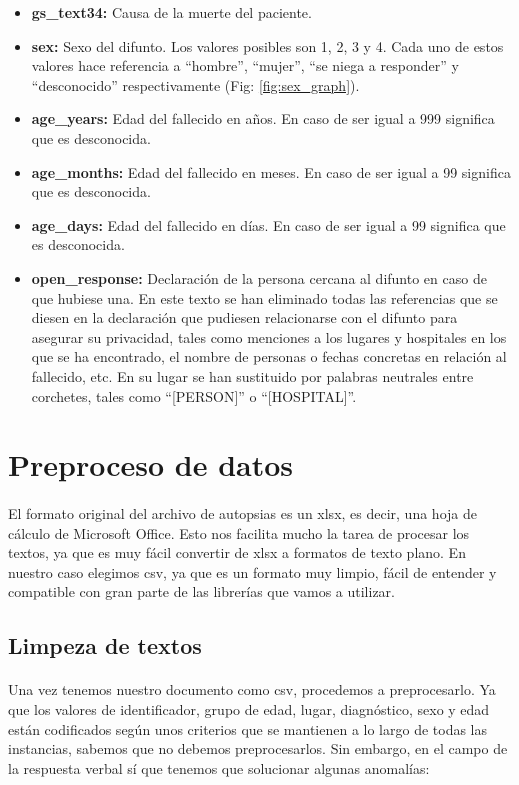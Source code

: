 \documentclass[10pt,a4paper]{article}
\begin{document}
\begin{itemize}
		\item \textbf{gs\_text34:} Causa de la muerte del paciente.
		\item \textbf{sex:} Sexo del difunto. Los valores posibles son 1, 2, 3 y 4. Cada uno de estos valores hace referencia a ``hombre'', ``mujer'', ``se niega a responder'' y ``desconocido'' respectivamente (Fig: \ref{fig:sex_graph}).
		\item \textbf{age\_years:} Edad del fallecido en años. En caso de ser igual a 999 significa que es desconocida.
		\item \textbf{age\_months:} Edad del fallecido en meses. En caso de ser igual a 99 significa que es desconocida.
		\item \textbf{age\_days:} Edad del fallecido en días. En caso de ser igual a 99 significa que es desconocida.
		\item \textbf{open\_response:} Declaración de la persona cercana al difunto en caso de que hubiese una. En este texto se han eliminado todas las referencias que se diesen en la declaración que pudiesen relacionarse con el difunto para asegurar su privacidad, tales como menciones a los lugares y hospitales en los que se ha encontrado, el nombre de personas o fechas concretas en relación al fallecido, etc. En su lugar se han sustituido por palabras neutrales entre corchetes, tales como ``[PERSON]'' o ``[HOSPITAL]''.
	\end{itemize}

\section{Preproceso de datos}
	\paragraph{}
	El formato original del archivo de autopsias es un xlsx, es decir, una hoja de cálculo de Microsoft Office. Esto nos facilita mucho la tarea de procesar los textos, ya que es muy fácil convertir de xlsx a formatos de texto plano. En nuestro caso elegimos csv, ya que es un formato muy limpio, fácil de entender y compatible con gran parte de las librerías que vamos a utilizar.

	\subsection{Limpeza de textos}
	\paragraph{}
	Una vez tenemos nuestro documento como csv, procedemos a preprocesarlo. Ya que los valores de identificador, grupo de edad, lugar, diagnóstico, sexo y edad están codificados según unos criterios que se mantienen a lo largo de todas las instancias, sabemos que no debemos preprocesarlos. Sin embargo, en el campo de la respuesta verbal sí que tenemos que solucionar algunas anomalías:
\end{document}
